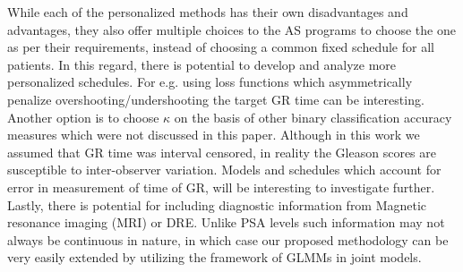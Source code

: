 While each of the personalized methods has their own disadvantages and advantages, they also offer multiple choices to the AS programs to choose the one as per their requirements, instead of choosing a common fixed schedule for all patients. In this regard, there is potential to develop and analyze more personalized schedules. For e.g. using loss functions which asymmetrically penalize overshooting/undershooting the target GR time can be interesting. Another option is to choose $\kappa$ on the basis of other binary classification accuracy measures which were not discussed in this paper. Although in this work we assumed that GR time was interval censored, in reality the Gleason scores are susceptible to inter-observer variation. Models and schedules which account for error in measurement of time of GR, will be interesting to investigate further. Lastly, there is potential for including diagnostic information from Magnetic resonance imaging (MRI) or DRE. Unlike PSA levels such information may not always be continuous in nature, in which case our proposed methodology can be very easily extended by utilizing the framework of GLMMs in joint models.